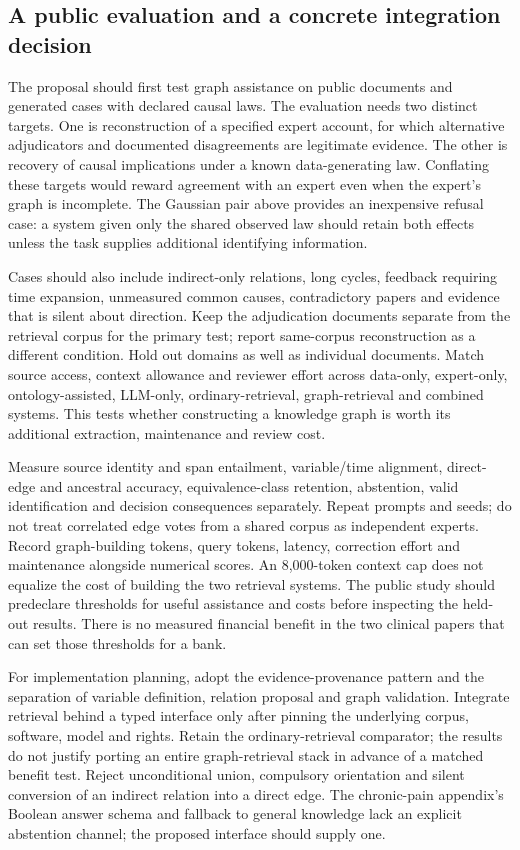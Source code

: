 \subsection{A public evaluation and a concrete integration decision}
\label{exec22:domain-validation}

The proposal should first test graph assistance on public documents and generated
cases with declared causal laws. The evaluation needs two distinct targets.
One is reconstruction of a specified expert account, for which alternative
adjudicators and documented disagreements are legitimate evidence. The other is
recovery of causal implications under a known data-generating law. Conflating
these targets would reward agreement with an expert even when the expert's graph
is incomplete. The Gaussian pair above provides an inexpensive refusal case:
a system given only the shared observed law should retain both effects unless
the task supplies additional identifying information.

Cases should also include indirect-only relations, long cycles, feedback requiring
time expansion, unmeasured common causes, contradictory papers and evidence that
is silent about direction. Keep the adjudication documents separate from the
retrieval corpus for the primary test; report same-corpus reconstruction as a
different condition. Hold out domains as well as individual documents. Match
source access, context allowance and reviewer effort across data-only,
expert-only, ontology-assisted, LLM-only, ordinary-retrieval, graph-retrieval and
combined systems. This tests whether constructing a knowledge graph is worth its
additional extraction, maintenance and review cost.

Measure source identity and span entailment, variable/time alignment, direct-edge
and ancestral accuracy, equivalence-class retention, abstention, valid
identification and decision consequences separately. Repeat prompts and seeds;
do not treat correlated edge votes from a shared corpus as independent experts.
Record graph-building tokens, query tokens, latency, correction effort and
maintenance alongside numerical scores. An 8,000-token context cap does not
equalize the cost of building the two retrieval systems. The public study should
predeclare thresholds for useful assistance and costs before inspecting the
held-out results. There is no measured financial benefit in the two clinical
papers that can set those thresholds for a bank.

For implementation planning, adopt the evidence-provenance pattern and the
separation of variable definition, relation proposal and graph validation.
Integrate retrieval behind a typed interface only after pinning the underlying
corpus, software, model and rights. Retain the ordinary-retrieval comparator;
the results do not justify porting an entire graph-retrieval stack in advance
of a matched benefit test. Reject unconditional union, compulsory orientation
and silent conversion of an indirect relation into a direct edge. The chronic-pain
appendix's Boolean answer schema and fallback to general knowledge lack an
explicit abstention channel; the proposed interface should supply one.
\citep{exec22_domain_lin}

